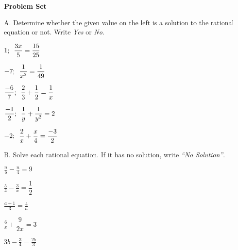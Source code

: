 \textbf{Problem Set}

\vspce



A. Determine whether the given value on the left is a solution to the rational equation or not. Write \emph{Yes} or \emph{No}.
\begin{enumerate}[label = \arabic*. ]
\begin{multicols}{3}
\item \hspce $1;\hspace{0.5em}  \displaystyle \frac{3x}{5} = \displaystyle \frac{15}{25} $
\item  \hspce $-7;\hspace{0.5em}  \displaystyle \frac{1}{x^2} = \displaystyle \frac{1}{49} $
\item  \hspce $\displaystyle \frac{-6}{7} ;\hspace{0.5em}  \dfrac{2}{3} + \dfrac{1}{2}   = \displaystyle \frac{1}{x} $
\item  \hspce $\dfrac{-1}{2} ;\hspace{0.5em}  \displaystyle \frac{1}{y} + \dfrac{1}{y^2}  = 2 $
\item  \hspce $-2;\hspace{0.5em}  \displaystyle \frac{2}{x} + \dfrac{x}{4}  = \displaystyle \frac{-3}{2} $
\end{multicols} 
\end{enumerate}  

B. Solve each rational equation. If it has no solution, write \emph{``No Solution''}. 

\begin{enumerate}[label = \arabic*. ]
\begin{multicols}{3}
\item \hspce $\displaystyle \frac{n}{6} - \displaystyle \frac{n}{4} =9 $
\item \hspce $\displaystyle \frac{5}{4} - \displaystyle \frac{3}{x} =\dfrac{1}{2} $
\item \hspce $\displaystyle \frac{a+1}{3}  = \displaystyle \frac{4}{a} $
\item \hspce $\displaystyle \frac{6}{x} + \dfrac{9}{2x}  = 3$
\item  \hspce $3b - \displaystyle \frac{3}{4} = \displaystyle \frac{2b}{3} $
\end{multicols} 
\end{enumerate}  